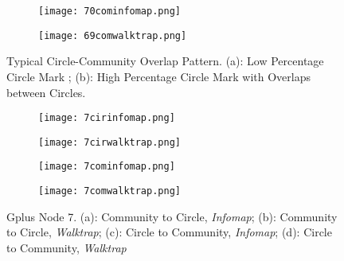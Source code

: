 \begin{figure}[h]
	\centering
	\begin{subfigure}{.5\textwidth}
		\centering
		\texttt{[image: 70cominfomap.png]}
		\caption{}		
		\label{fig:70cim}
	\end{subfigure}%
	\begin{subfigure}{.5\textwidth}
		\centering
		\texttt{[image: 69comwalktrap.png]}
		\caption{}	
		\label{fig:69cwk}
	\end{subfigure}
	\caption{Typical Circle-Community Overlap Pattern. (a): Low Percentage Circle Mark ; (b): High Percentage Circle Mark with Overlaps between Circles.}
	\label{fig:prep}
\end{figure}

\begin{figure}[h]
	\centering
	\begin{subfigure}{.5\textwidth}
		\centering
		\texttt{[image: 7cirinfomap.png]}
		\caption{}		
		\label{fig:7cirinfomap}
	\end{subfigure}%
	\begin{subfigure}{.5\textwidth}
		\centering
		\texttt{[image: 7cirwalktrap.png]}
		\caption{}	
		\label{fig:7cirwalktrap}
	\end{subfigure}
	\begin{subfigure}{.7\textwidth}
		\centering
		\texttt{[image: 7cominfomap.png]}
		\caption{}	
		\label{fig:7cominfomap}
	\end{subfigure}
	\begin{subfigure}{.7\textwidth}
		\centering
		\texttt{[image: 7comwalktrap.png]}
		\caption{}	
		\label{fig:7comwalktrap}
	\end{subfigure}
	\caption{Gplus Node 7. (a): Community to Circle, \textit{Infomap}; (b): Community to Circle, \textit{Walktrap}; (c): Circle to Community, \textit{Infomap}; (d): Circle to Community, \textit{Walktrap}}
	\label{fig:7}
\end{figure}


